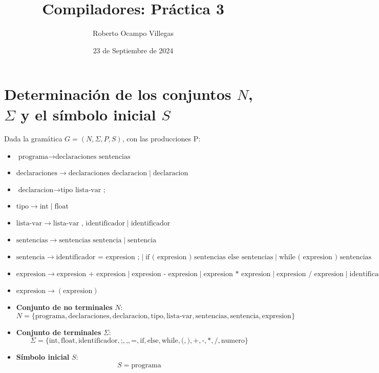 \documentclass{article}
\title{Compiladores: Práctica 3}
\author{Roberto Ocampo Villegas}
\date{23 de Septiembre de 2024}
\begin{document}
\maketitle

\section*{Determinación de los conjuntos \( N \), \( \Sigma \) y el símbolo inicial \( S \)}

Dada la gramática \( G = (N, \Sigma, P, S) \), con las producciones P:

{\renewcommand{\labelitemi}{--}
\begin{itemize}
    \item \( \text{programa} \to \text{declaraciones sentencias} \)
    \item \( \text{declaraciones} \to \text{declaraciones declaracion} \mid \text{declaracion} \)
    \item \( \text{declaracion} \to \text{tipo lista-var ;} \)
    \item \( \text{tipo} \to \text{int} \mid \text{float} \)
    \item \( \text{lista-var} \to \text{lista-var , identificador} \mid \text{identificador} \)
    \item \( \text{sentencias} \to \text{sentencias sentencia} \mid \text{sentencia} \)
    \item \( \text{sentencia} \to \text{identificador = expresion ;} \mid \text{if ( expresion ) sentencias else sentencias} \mid \text{while ( expresion ) sentencias} \)
    \item \( \text{expresion} \to \text{expresion + expresion} \mid \text{expresion - expresion} \mid \text{expresion * expresion} \mid \text{expresion / expresion} \mid \text{identificador} \mid \text{numero} \)
    \item \( \text{expresion} \to ( \text{expresion} ) \)
\end{itemize}
}

\begin{itemize}
    \item \textbf{Conjunto de no terminales} \( N \):
    \[
    N = \{ \text{programa}, \text{declaraciones}, \text{declaracion}, \text{tipo}, \text{lista-var}, \text{sentencias}, \text{sentencia}, \text{expresion} \}
    \]

    \item \textbf{Conjunto de terminales} \( \Sigma \):
    \[
    \Sigma = \{ \text{int}, \text{float}, \text{identificador}, \text{;} , \text{,}, \text{=}, \text{if}, \text{else}, \text{while}, \text{(}, \text{)}, \text{+}, \text{-}, \text{*}, \text{/}, \text{numero} \}
    \]

    \item \textbf{Símbolo inicial} \( S \):
    \[
    S = \text{programa}
    \]
\end{itemize}
\end{document}
